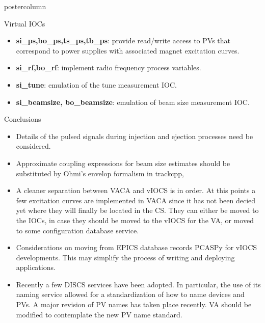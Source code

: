 \documentclass[20pt]{beamer}
\begin{document}
\begin{frame}
\begin{columns}
\begin{column}{.55\textwidth}
\begin{beamercolorbox}[center]{postercolumn}
\begin{minipage}{.98\textwidth}
{\begin{myblock}{Virtual IOCs}
\begin{itemize}
					\item \textbf{si\_ps,bo\_ps,ts\_ps,tb\_ps}: provide read/write access to PVs that correspond to power supplies with associated magnet excitation curves.
					\item \textbf{si\_rf,bo\_rf}: implement radio frequency process variables.
					\item \textbf{si\_tune}: emulation of the tune measurement IOC.
					\item \textbf{si\_beamsize, bo\_beamsize}: emulation of beam size measurement IOC.
					\end{itemize}
						\vspace{0.5cm}
					\end{myblock}\vfill
					\begin{myblock}{Conclusions}
					\begin{itemize}
					\item Details of the pulsed signals during injection and ejection processes need be considered.
					\item Approximate coupling expressions for beam size estimates should be substituted by Ohmi's envelop formalism\cite{ohmi} in trackcpp,
					\item A cleaner separation between VACA and vIOCS is in order. At this points a few excitation curves are implemented in VACA since it has not been decied yet where they will finally be located in the CS. They can either be moved to the IOCs, in case they should be moved to the vIOCS for the VA, or moved to some configuration database service.
					\item Considerations on moving from EPICS database records PCASPy for vIOCS developments. This may simplify the process of writing and deploying applications.
					\item Recently a few DISCS\cite{discs} services have been adopted. In particular, the use of its naming service allowed for a standardization of how to name devices and PVs. A major revision of PV names has taken place recently. VA should be modified to contemplate the new PV name standard.
					\end{itemize}
						\vspace{0.5cm}
					\end{myblock}\vfill
		}\end{minipage}\end{beamercolorbox}
	\end{column}
\end{columns}
\end{frame}
\end{document}
